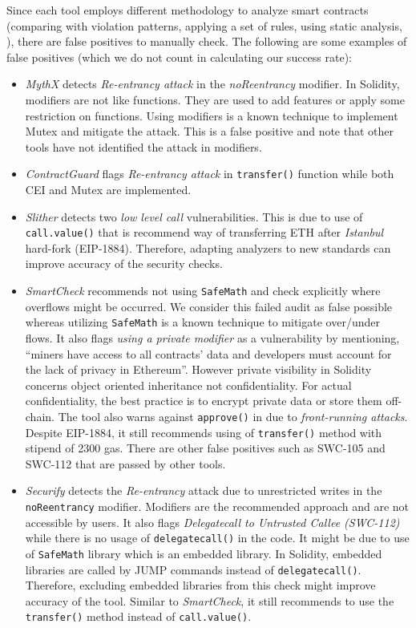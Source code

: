 Since each tool employs different methodology to analyze smart contracts (\eg comparing with violation patterns, applying a set of rules, using static analysis, \etc), there are false positives to manually check. The following are some examples of false positives (which we do not count in calculating our success rate):
\begin{itemize}[noitemsep,topsep=0pt]
	\item \textit{MythX} detects \textit{Re-entrancy attack} in the \textit{noReentrancy} modifier. In Solidity, modifiers are not like functions. They are used to add features or apply some restriction on functions\cite{SolidityModifer}. Using modifiers is a known technique to implement Mutex and mitigate the attack\cite{ReentrancyGuard}. This is a false positive and note that other tools have not identified the attack in modifiers.

	\item \textit{ContractGuard} flags \textit{Re-entrancy attack} in \texttt{transfer()} function while both CEI and Mutex are implemented.

	\item \textit{Slither} detects two \textit{low level call} vulnerabilities\cite{SlitherSetup}. This is due to use of \texttt{call.value()} that is recommend way of transferring ETH after \textit{Istanbul} hard-fork (EIP-1884).	Therefore, adapting analyzers to new standards can improve accuracy of the security checks.

	\item \textit{SmartCheck} recommends not using \texttt{SafeMath} and check explicitly where overflows might be occurred. We consider this failed audit as false possible whereas utilizing \texttt{SafeMath} is a known technique to mitigate over/under flows. It also flags \textit{using a private modifier} as a vulnerability by mentioning, ``miners have access to all contracts' data and developers must account for the lack of privacy in Ethereum''. However private visibility in Solidity concerns object oriented inheritance not confidentiality. For actual confidentiality, the best practice is to encrypt private data or store them off-chain. The tool also warns against \texttt{approve()} in \erc due to \textit{front-running attacks}. Despite EIP-1884, it still recommends using of \texttt{transfer()} method with stipend of 2300 gas. There are other false positives such as SWC-105 and SWC-112 that are passed by other tools.

	\item \textit{Securify} detects the \textit{Re-entrancy} attack due to unrestricted writes in the \texttt{noReentrancy} modifier\cite{SECURIFY}. Modifiers are the recommended approach and are not accessible by users. It also flags \textit{Delegatecall to Untrusted Callee (SWC-112)} while there is no usage of \texttt{delegatecall()} in the code. It might be due to use of \texttt{SafeMath} library which is an embedded library. In Solidity, embedded libraries are called by JUMP commands instead of \texttt{delegatecall()}. Therefore, excluding embedded libraries from this check might improve accuracy of the tool. Similar to \textit{SmartCheck}, it still recommends to use the \texttt{transfer()} method instead of \texttt{call.value()}.


\end{itemize}
